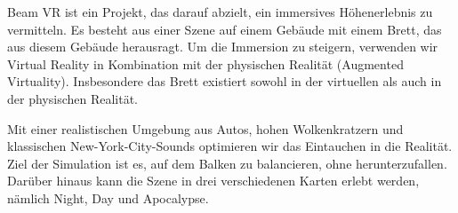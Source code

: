 Beam VR ist ein Projekt, das darauf abzielt, ein immersives Höhenerlebnis zu vermitteln.
Es besteht aus einer Szene auf einem Gebäude mit einem Brett, das aus diesem Gebäude herausragt.
Um die Immersion zu steigern, verwenden wir Virtual Reality in Kombination mit der physischen Realität (Augmented Virtuality).
Insbesondere das Brett existiert sowohl in der virtuellen als auch in der physischen Realität.

Mit einer realistischen Umgebung aus Autos, hohen Wolkenkratzern und klassischen New-York-City-Sounds optimieren wir das Eintauchen in die Realität.
Ziel der Simulation ist es, auf dem Balken zu balancieren, ohne herunterzufallen.
Darüber hinaus kann die Szene in drei verschiedenen Karten erlebt werden, nämlich Night, Day und Apocalypse.
